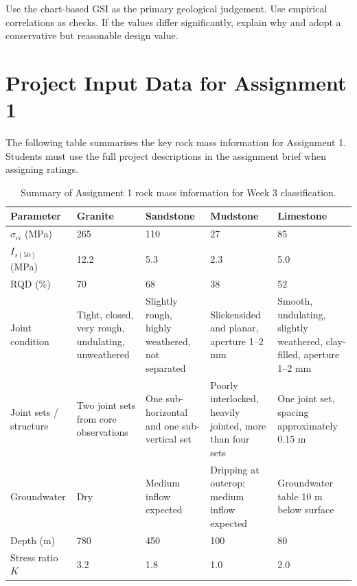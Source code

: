 \documentclass[a4paper,12pt]{article}
\begin{document}
\begin{keybox}
Use the chart-based GSI as the primary geological judgement. Use empirical correlations
as checks. If the values differ significantly, explain why and adopt a conservative but
reasonable design value.
\end{keybox}

\section{Project Input Data for Assignment 1}

The following table summarises the key rock mass information for Assignment 1.
Students must use the full project descriptions in the assignment brief when assigning
ratings.

\begin{table}[H]
\centering
\scriptsize
\begin{tabularx}{\textwidth}{l Y Y Y Y}
\toprule
\textbf{Parameter} & \textbf{Granite} & \textbf{Sandstone} & \textbf{Mudstone} & \textbf{Limestone} \\
\midrule
\(\sigma_{ci}\) (MPa) & 265 & 110 & 27 & 85 \\
\(I_{s(50)}\) (MPa) & 12.2 & 5.3 & 2.3 & 5.0 \\
RQD (\%) & 70 & 68 & 38 & 52 \\
Joint condition & Tight, closed, very rough, undulating, unweathered & Slightly rough, highly weathered, not separated & Slickensided and planar, aperture 1--2 mm & Smooth, undulating, slightly weathered, clay-filled, aperture 1--2 mm \\
Joint sets / structure & Two joint sets from core observations & One sub-horizontal and one sub-vertical set & Poorly interlocked, heavily jointed, more than four sets & One joint set, spacing approximately 0.15 m \\
Groundwater & Dry & Medium inflow expected & Dripping at outcrop; medium inflow expected & Groundwater table 10 m below surface \\
Depth (m) & 780 & 450 & 100 & 80 \\
Stress ratio \(K\) & 3.2 & 1.8 & 1.0 & 2.0 \\
\bottomrule
\end{tabularx}
\caption{Summary of Assignment 1 rock mass information for Week 3 classification.}
\label{tab:assignment1_week3_data}
\end{table}
\end{document}
